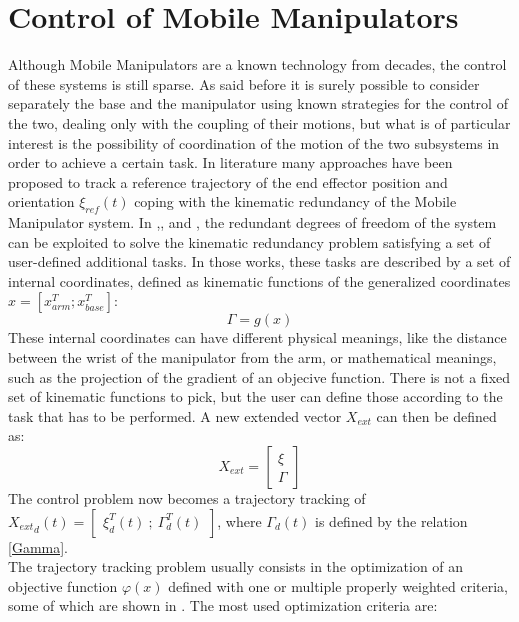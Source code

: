\section{Control of Mobile Manipulators}
Although Mobile Manipulators are a known technology from decades, the control of these systems is still sparse. As said before it is surely possible to consider separately the base and the manipulator using known strategies for the control of the two, dealing only with the coupling of their motions, but what is of particular interest is the possibility of coordination of the motion of the two subsystems in order to achieve a certain task. In literature many approaches have been proposed to track a reference trajectory of the end effector position and orientation $\xi_{ref}(t)$ coping with the kinematic redundancy of the Mobile Manipulator system. In \cite{bayle},\cite{seraji1998},\cite{seraji1993} and \cite{mikschschroeder}, the redundant degrees of freedom of the system can be exploited to solve the kinematic redundancy problem satisfying a set of user-defined additional tasks. In those works, these tasks are described by a set of internal coordinates, defined as kinematic functions of the generalized coordinates $x=\left[x_{arm}^T ; x_{base}^T\right]$:
\begin{equation}\label{Gamma}
	\Gamma=g(x)
\end{equation}
These internal coordinates can have different physical meanings, like the distance between the wrist of the manipulator from the arm, or mathematical meanings, such as the projection of the gradient of an objecive function. There is not a fixed set of kinematic functions to pick, but the user can define those according to the task that has to be performed. A new extended vector $X_{ext}$ can then be defined as:
\begin{equation}
	X_{ext}=\left[\begin{matrix}
	\xi \\ \Gamma
	\end{matrix}\right]
\end{equation}
The control problem now becomes a trajectory tracking of ${X_{ext}}_d(t) =\left[\begin{matrix} \xi_d^T(t) \ ;\ \Gamma_d^T(t) \end{matrix}\right]$, where $ \Gamma_d(t)$ is defined by the relation \eqref{Gamma}.\\
The trajectory tracking problem usually consists in the optimization of an objective function $\varphi(x)$ defined with one or multiple properly weighted criteria, some of which are shown in \cite{multicriteria}. The most used optimization criteria are: 

